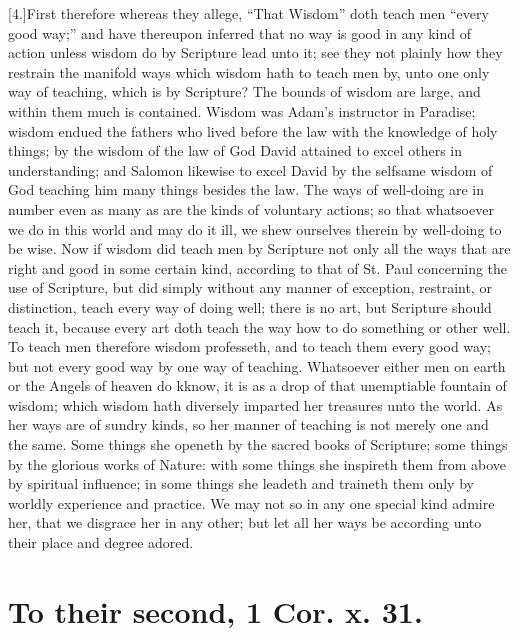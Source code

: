 [4.]First therefore whereas they allege, “That Wisdom” doth teach men “every good way;” and have thereupon inferred that no way is good in any kind of action unless wisdom do by Scripture lead unto it; see they not plainly how they restrain the manifold ways which wisdom hath to teach men by, unto one only way of teaching, which is by Scripture? The bounds of wisdom are large, and within them much is contained. Wisdom was Adam’s instructor in Paradise; wisdom endued the fathers who lived before the law with the knowledge of holy things; by the wisdom of the law of God David attained to excel others in understanding; and Salomon likewise to excel David by the selfsame wisdom of God teaching him many things besides the law. The ways of well-doing are in number even as  many as are the kinds of voluntary actions; so that whatsoever we do in this world and may do it ill, we shew ourselves therein by well-doing to be wise. Now if wisdom did teach men by Scripture not only all the ways that are right and good in some certain kind, according to that of St. Paul concerning the use of Scripture, but did simply without any manner of exception, restraint, or distinction, teach every way of doing well; there is no art, but Scripture should teach it, because every art doth teach the way how to do something or other well. To teach men therefore wisdom professeth, and to teach them every good way; but not every good way by one way of teaching. Whatsoever either men on earth or the Angels of heaven do kknow, it is as a drop of that unemptiable fountain of wisdom; which wisdom hath diversely imparted her treasures unto the world. As her ways are of sundry kinds, so her manner of teaching is not merely one and the same. Some things she openeth by the sacred books of Scripture; some things by the glorious works of Nature: with some things she inspireth them from above by spiritual influence; in some things she leadeth and traineth them only by worldly experience and practice. We may not so in any one special kind admire her, that we disgrace her in any other; but let all her ways be according unto their place and degree adored.

\section*{To their second, 1 Cor. x. 31.}

